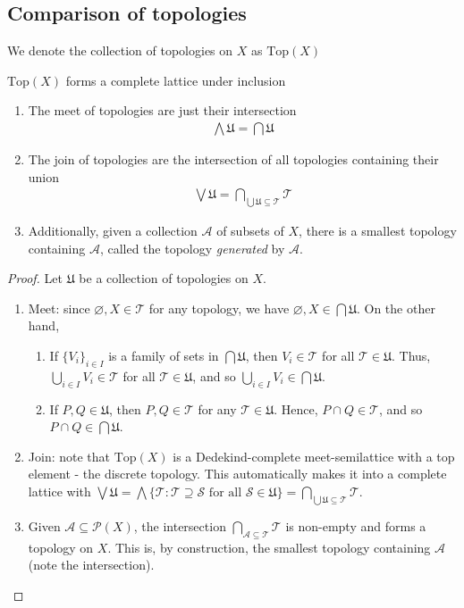 \documentclass{treatise}
\begin{document}
\subsection{Comparison of topologies}
We denote the collection of topologies on $X$ as $\mathrm{Top}(X)$
\begin{proposition}
$\mathrm{Top}(X)$ forms a complete lattice under inclusion
\begin{enumerate}
    \item The meet of topologies are just their intersection
    \begin{align*}
        \bigwedge \mathfrak{U} = \bigcap \mathfrak{U}
    \end{align*}
    \item The join of topologies are the intersection of all topologies containing their union
    \begin{align*}
        \bigvee \mathfrak{U} = \bigcap_{\bigcup \mathfrak{U} \subseteq \mathcal{T}} \mathcal{T}
    \end{align*}
    \item Additionally, given a collection $\mathcal{A}$ of subsets of $X$, there is a smallest topology containing $\mathcal{A}$, called the topology \emph{generated} by $\mathcal{A}$.
\end{enumerate}
\end{proposition}
\begin{proof}
Let $\mathfrak{U}$ be a collection of topologies on $X$.
\begin{enumerate}
    \item Meet: since $\varnothing, X \in \mathcal{T}$ for any topology, we have $\varnothing, X \in \bigcap \mathfrak{U}$. On the other hand,
    \begin{enumerate}
        \item If $\{ V_i \}_{i \in I}$ is a family of sets in $\bigcap \mathfrak{U}$, then $V_i \in \mathcal{T}$ for all $\mathcal{T} \in \mathfrak{U}$. Thus, $\bigcup_{i \in I} V_i \in \mathcal{T}$ for all $\mathcal{T} \in \mathfrak{U}$, and so $\bigcup_{i \in I} V_i \in \bigcap \mathfrak{U}$.
        \item If $P, Q \in \mathfrak{U}$, then $P, Q \in \mathcal{T}$ for any $\mathcal{T} \in \mathfrak{U}$. Hence, $P \cap Q \in \mathcal{T}$, and so $P \cap Q \in \bigcap \mathfrak{U}$.
    \end{enumerate}
    \item Join: note that $\mathrm{Top}(X)$ is a Dedekind-complete meet-semilattice with a top element - the discrete topology. This automatically makes it into a complete lattice with $\bigvee \mathfrak{U} = \bigwedge \{ \mathcal{T} : \mathcal{T} \supseteq \mathcal{S} \mbox{ for all } \mathcal{S} \in \mathfrak{U} \} = \bigcap_{\bigcup \mathfrak{U} \subseteq \mathcal{T}} \mathcal{T}$.
    \item Given $\mathcal{A} \subseteq \mathcal{P}(X)$, the intersection $\bigcap_{\mathcal{A} \subseteq \mathcal{T}} \mathcal{T}$ is non-empty and forms a topology on $X$. This is, by construction, the smallest topology containing $\mathcal{A}$ (note the intersection).
\end{enumerate}
\end{proof}
\end{document}
